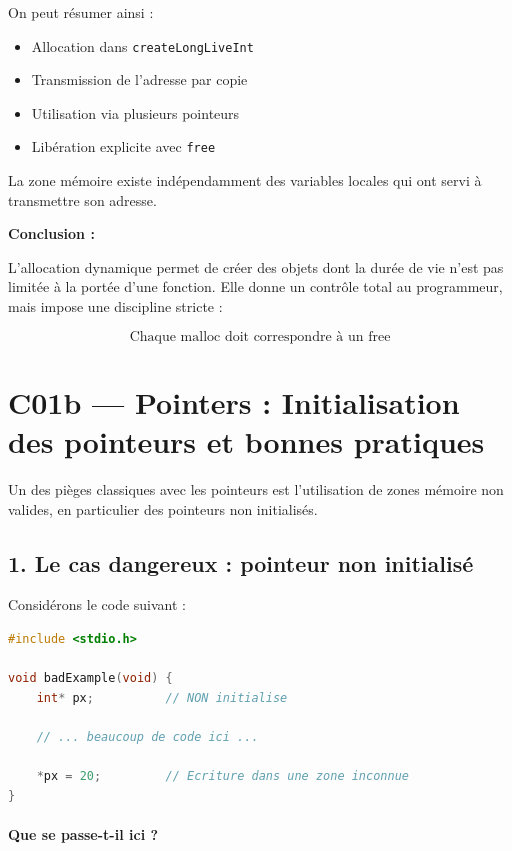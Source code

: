 On peut résumer ainsi :

\begin{itemize}
    \item Allocation dans \texttt{createLongLiveInt}
    \item Transmission de l’adresse par copie
    \item Utilisation via plusieurs pointeurs
    \item Libération explicite avec \texttt{free}
\end{itemize}

La zone mémoire existe indépendamment des variables locales
qui ont servi à transmettre son adresse.

\bigskip
\textbf{Conclusion :}

L’allocation dynamique permet de créer des objets dont la durée de vie
n’est pas limitée à la portée d’une fonction.
Elle donne un contrôle total au programmeur,
mais impose une discipline stricte :

\[
\boxed{\text{Chaque malloc doit correspondre à un free}}
\]

\section{C01b — Pointers : Initialisation des pointeurs et bonnes pratiques}

Un des pièges classiques avec les pointeurs est l’utilisation de zones mémoire
non valides, en particulier des pointeurs non initialisés.

\subsection{1. Le cas dangereux : pointeur non initialisé}

Considérons le code suivant :

\begin{lstlisting}[language=C]
#include <stdio.h>

void badExample(void) {
    int* px;          // NON initialise

    // ... beaucoup de code ici ...

    *px = 20;         // Ecriture dans une zone inconnue
}
\end{lstlisting}

\paragraph{Que se passe-t-il ici ?}

